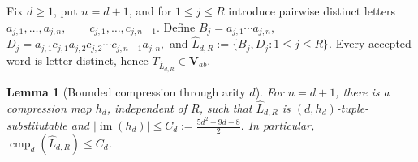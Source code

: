 \documentclass[10pt,a4paper]{article}
\newtheorem{lemma}[theorem]{Lemma}
\theoremstyle{definition}
\theoremstyle{remark}
\newcommand{\cmp}{\operatorname{cmp}}
\begin{document}
Fix \(d\ge1\), put \(n=d+1\), and for \(1\le j\le R\) introduce pairwise
distinct letters
\(a_{j,1},\ldots,a_{j,n}, \qquad c_{j,1},\ldots,c_{j,n-1}.\)
Define \(B_j=a_{j,1}\cdots a_{j,n},\) \(
D_j=a_{j,1}c_{j,1}a_{j,2}c_{j,2}\cdots
c_{j,n-1}a_{j,n},
\)
and
\(\widehat L_{d,R}:=\{B_j,D_j:1\le j\le R\}.\)
Every accepted word is letter-distinct, hence
\(T_{\widehat L_{d,R}}\in\mathbf V_{ab}\).

\begin{lemma}[Bounded compression through arity \(d\)]
\label{vab:lem:low}
For \(n=d+1\), there is a compression map \(h_d\), independent of \(R\), such
that \(\widehat L_{d,R}\) is \((d,h_d)\)-tuple-substitutable and
\(
  |\operatorname{im}(h_d)|\le
  C_d:=\frac{5d^2+9d+8}{2}.
\)
In particular, \(\cmp_d(\widehat L_{d,R})\le C_d\).
\end{lemma}
\end{document}
